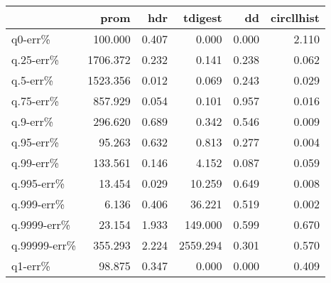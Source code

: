 \begin{tabular}{lrrrrr}
\toprule
{} &     prom &   hdr &  tdigest &    dd &  circllhist \\
\midrule
q0-err\%      &  100.000 & 0.407 &    0.000 & 0.000 &       2.110 \\
q.25-err\%    & 1706.372 & 0.232 &    0.141 & 0.238 &       0.062 \\
q.5-err\%     & 1523.356 & 0.012 &    0.069 & 0.243 &       0.029 \\
q.75-err\%    &  857.929 & 0.054 &    0.101 & 0.957 &       0.016 \\
q.9-err\%     &  296.620 & 0.689 &    0.342 & 0.546 &       0.009 \\
q.95-err\%    &   95.263 & 0.632 &    0.813 & 0.277 &       0.004 \\
q.99-err\%    &  133.561 & 0.146 &    4.152 & 0.087 &       0.059 \\
q.995-err\%   &   13.454 & 0.029 &   10.259 & 0.649 &       0.008 \\
q.999-err\%   &    6.136 & 0.406 &   36.221 & 0.519 &       0.002 \\
q.9999-err\%  &   23.154 & 1.933 &  149.000 & 0.599 &       0.670 \\
q.99999-err\% &  355.293 & 2.224 & 2559.294 & 0.301 &       0.570 \\
q1-err\%      &   98.875 & 0.347 &    0.000 & 0.000 &       0.409 \\
\bottomrule
\end{tabular}
